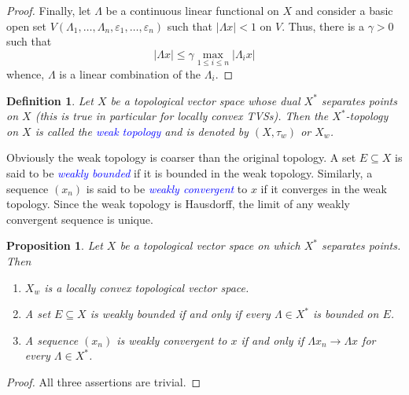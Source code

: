 \documentclass[11pt]{article}
\theoremstyle{thmstyle}
\newtheorem{proposition}[theorem]{Proposition}
\theoremstyle{defstyle}
\newtheorem{definition}[theorem]{Definition}
\newcommand{\define}[1]{\textcolor{blue}{\textit{#1}}}
\renewcommand{\le}{\leqslant}
\begin{document}
\begin{proof}
    Finally, let $\Lambda$ be a continuous linear functional on $X$ and consider a basic open set $V(\Lambda_1,\dots,\Lambda_n,\varepsilon_1,\dots,\varepsilon_n)$ such that $|\Lambda x| <1$ on $V$. Thus, there is a $\gamma > 0$ such that 
    \begin{equation*}
        |\Lambda x|\le\gamma\max_{1\le i\le n}|\Lambda_i x|
    \end{equation*}
    whence, $\Lambda$ is a linear combination of the $\Lambda_i$.
\end{proof}

\begin{definition}
    Let $X$ be a topological vector space whose dual $X^\ast$ separates points on $X$ (this is true in particular for locally convex TVSs). Then the $X^\ast$-topology on $X$ is called the \define{weak topology} and is denoted by $(X, \tau_w)$ or $X_w$.
\end{definition}

Obviously the weak topology is coarser than the original topology. A set $E\subseteq X$ is said to be \define{weakly bounded} if it is bounded in the weak topology. Similarly, a sequence $(x_n)$ is said to be \define{weakly convergent} to $x$ if it converges in the weak topology. Since the weak topology is Hausdorff, the limit of any weakly convergent sequence is unique.

\begin{proposition}
    Let $X$ be a topological vector space on which $X^\ast$ separates points. Then 
    \begin{enumerate}[label=(\alph*)]
        \item $X_w$ is a locally convex topological vector space. 
        \item A set $E\subseteq X$ is weakly bounded if and only if every $\Lambda\in X^\ast$ is bounded on $E$. 
        \item A sequence $(x_n)$ is weakly convergent to $x$ if and only if $\Lambda x_n\to \Lambda x$ for every $\Lambda\in X^\ast$.
    \end{enumerate}
\end{proposition}
\begin{proof}
    All three assertions are trivial.
\end{proof}
\end{document}
